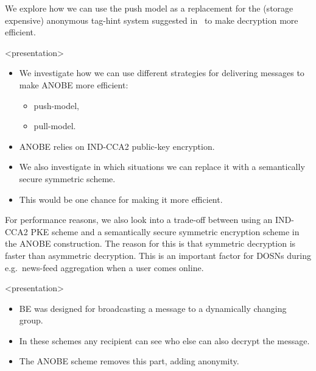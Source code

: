 We explore how we can use the push model as a replacement for the (storage 
expensive) anonymous tag-hint system suggested in~\cite{anobe} to make 
decryption more efficient.

\begin{frame}<presentation>
  \begin{itemize}

    \item We investigate how we can use different strategies for delivering 
      messages to make \ac{ANOBE} more efficient:
      \begin{itemize}
        \item push-model,
        \item pull-model.
      \end{itemize}

    \item \ac{ANOBE} relies on IND-CCA2 public-key encryption.

    \item We also investigate in which situations we can replace it with 
      a semantically secure symmetric scheme.

    \item This would be one chance for making it more efficient.

  \end{itemize}
\end{frame}

For performance reasons, we also look into a trade-off between using an 
IND-CCA2 \ac{PKE} scheme and a semantically secure symmetric encryption scheme 
in the \ac{ANOBE} construction.
The reason for this is that symmetric decryption is faster than asymmetric 
decryption.
This is an important factor for \acp{DOSN} during e.g.~news-feed aggregation 
when a user comes online.

\begin{frame}<presentation>
  \begin{itemize}
    \item \ac{BE} was designed for broadcasting a message to a dynamically 
      changing group.

    \item In these schemes any recipient can see who else can also decrypt the 
      message.

    \item The \ac{ANOBE} scheme removes this part, adding anonymity.

  \end{itemize}
\end{frame}


